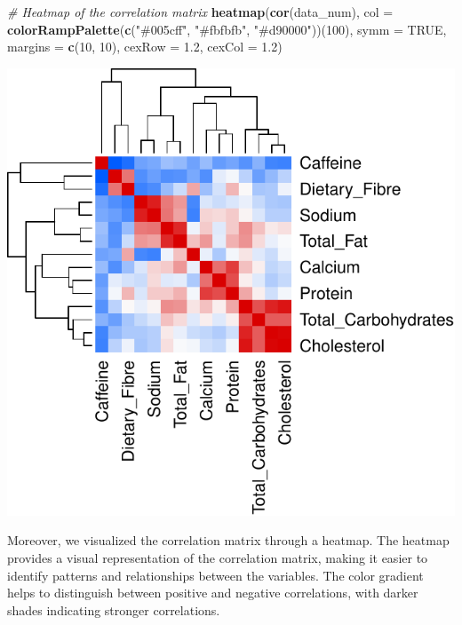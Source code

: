 \documentclass[
]{article}
\newenvironment{Shaded}{\begin{snugshade}}{\end{snugshade}}
\newcommand{\AttributeTok}[1]{\textcolor[rgb]{0.13,0.29,0.53}{#1}}
\newcommand{\CommentTok}[1]{\textcolor[rgb]{0.56,0.35,0.01}{\textit{#1}}}
\newcommand{\ConstantTok}[1]{\textcolor[rgb]{0.56,0.35,0.01}{#1}}
\newcommand{\DecValTok}[1]{\textcolor[rgb]{0.00,0.00,0.81}{#1}}
\newcommand{\FloatTok}[1]{\textcolor[rgb]{0.00,0.00,0.81}{#1}}
\newcommand{\FunctionTok}[1]{\textcolor[rgb]{0.13,0.29,0.53}{\textbf{#1}}}
\newcommand{\NormalTok}[1]{#1}
\newcommand{\StringTok}[1]{\textcolor[rgb]{0.31,0.60,0.02}{#1}}
\begin{document}
\begin{Shaded}
\begin{Highlighting}[]
\CommentTok{\# Heatmap of the correlation matrix}
\FunctionTok{heatmap}\NormalTok{(}\FunctionTok{cor}\NormalTok{(data\_num), }
        \AttributeTok{col =} \FunctionTok{colorRampPalette}\NormalTok{(}\FunctionTok{c}\NormalTok{(}\StringTok{"\#005cff"}\NormalTok{, }\StringTok{"\#fbfbfb"}\NormalTok{, }\StringTok{"\#d90000"}\NormalTok{))(}\DecValTok{100}\NormalTok{), }
        \AttributeTok{symm =} \ConstantTok{TRUE}\NormalTok{, }
        \AttributeTok{margins =} \FunctionTok{c}\NormalTok{(}\DecValTok{10}\NormalTok{, }\DecValTok{10}\NormalTok{), }
        \AttributeTok{cexRow =} \FloatTok{1.2}\NormalTok{,}
        \AttributeTok{cexCol =} \FloatTok{1.2}\NormalTok{)}
\end{Highlighting}
\end{Shaded}

\begin{center}\includegraphics{Statistical_Learning_Final_Report_files/figure-latex/correlation_analysis-2} \end{center}

Moreover, we visualized the correlation matrix through a heatmap. The
heatmap provides a visual representation of the correlation matrix,
making it easier to identify patterns and relationships between the
variables. The color gradient helps to distinguish between positive and
negative correlations, with darker shades indicating stronger
correlations.
\end{document}
